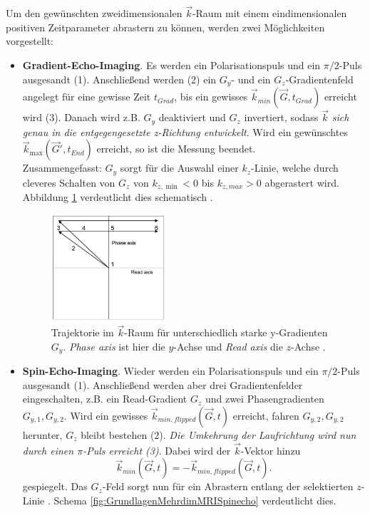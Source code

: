 \documentclass[../main.tex]{subfiles}
\begin{document}
    Um den gewünschten zweidimensionalen $\vec{k}$-Raum mit einem eindimensionalen positiven Zeitparameter abrastern zu können, werden zwei Möglichkeiten vorgestellt:
    \begin{itemize}
        \item \textbf{Gradient-Echo-Imaging}. Es werden ein Polarisationspuls und ein $\pi/2$-Puls ausgesandt (1). Anschließend werden (2) ein $G_y$- und ein $G_z$-Gradientenfeld angelegt für eine gewisse Zeit $t_{Grad}$, bis ein gewisses $\vec{k}_{min}(\vec{G}, t_{Grad})$ erreicht wird (3). Danach wird z.B. $G_y$ deaktiviert und $G_z$ invertiert, sodass \textit{$\vec{k}$ sich genau in die entgegengesetzte z-Richtung entwickelt}. Wird ein gewünschtes $\vec{k}_{\max}(\vec{G}', t_{End})$ erreicht, so ist die Messung beendet.\\

        Zusammengefasst: $G_y$ sorgt für die Auswahl einer $k_z$-Linie, welche durch cleveres Schalten von $G_z$ von $k_{z,\min}<0$ bis $k_{z,max}>0$ abgerastert wird. Abbildung \ref{fig:GrundlagenMehrdimMRIGradientecho} verdeutlicht dies schematisch \cite[p.74]{doc:EFNMRStudentManual}.

        \begin{figure}[H]
            \centering
            \includegraphics[width=0.4\textwidth]{Bilddateien/GrundlagenMehrdimMRIGradientecho.jpg}
            \caption{Trajektorie im $\vec{k}$-Raum für unterschiedlich starke y-Gradienten $G_y$. \textit{Phase axis} ist hier die $y$-Achse und \textit{Read axis} die $z$-Achse \cite[p.74]{doc:EFNMRStudentManual}.}
            \label{fig:GrundlagenMehrdimMRIGradientecho}
        \end{figure}
        
        \item \textbf{Spin-Echo-Imaging}. Wieder werden ein Polarisationspuls und ein $\pi/2$-Puls ausgesandt (1). Anschließend werden aber drei Gradientenfelder eingeschalten, z.B. ein Read-Gradient $G_z$ und zwei Phasengradienten $G_{y,1}, G_{y,2}$. Wird ein gewisses $\vec{k}_{min, flipped}(\vec{G}, t)$ erreicht, fahren $G_{y,2}, G_{y,2}$ herunter, $G_z$ bleibt bestehen (2). \textit{Die Umkehrung der Laufrichtung wird nun durch einen $\pi$-Puls erreicht (3)}. Dabei wird der $\vec k$-Vektor hinzu 
        \[
        \vec{k}_{min}(\vec{G}, t) = -\vec{k}_{min, flipped}(\vec{G}, t).
        \]
        gespiegelt. Das $G_z$-Feld sorgt nun für ein Abrastern entlang der selektierten $z$-Linie \cite[p.81-82]{doc:EFNMRStudentManual}. Schema \ref{fig:GrundlagenMehrdimMRISpinecho} verdeutlicht dies.


\end{itemize}
\end{document}
